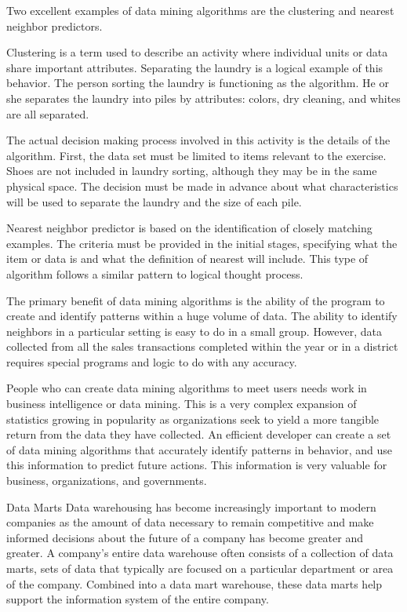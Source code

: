 Two excellent examples of data mining algorithms are the clustering and nearest neighbor predictors.
 
Clustering is a term used to describe an activity where individual units or data share important attributes. Separating the laundry is a logical example of this behavior. The person sorting the laundry is functioning as the algorithm. He or she separates the laundry into piles by attributes: colors, dry cleaning, and whites are all separated.
 
The actual decision making process involved in this activity is the details of the algorithm. First, the data set must be limited to items relevant to the exercise. Shoes are not included in laundry sorting, although they may be in the same physical space. The decision must be made in advance about what characteristics will be used to separate the laundry and the size of each pile.
 
Nearest neighbor predictor is based on the identification of closely matching examples. The criteria must be provided in the initial stages, specifying what the item or data is and what the definition of nearest will include. This type of algorithm follows a similar pattern to logical thought process.
 
The primary benefit of data mining algorithms is the ability of the program to create and identify patterns within a huge volume of data. The ability to identify neighbors in a particular setting is easy to do in a small group. However, data collected from all the sales transactions completed within the year or in a district requires special programs and logic to do with any accuracy.
 
People who can create data mining algorithms to meet users needs work in business intelligence or data mining. This is a very complex expansion of statistics growing in popularity as organizations seek to yield a more tangible return from the data they have collected. An efficient developer can create a set of data mining algorithms that accurately identify patterns in behavior, and use this information to predict future actions. This information is very valuable for business, organizations, and governments.

 
Data Marts
Data warehousing has become increasingly important to modern companies as the amount of data necessary to remain competitive and make informed decisions about the future of a company has become greater and greater. A company's entire data warehouse often consists of a collection of data marts, sets of data that typically are focused on a particular department or area of the company. Combined into a data mart warehouse, these data marts help support the information system of the entire company.
 
